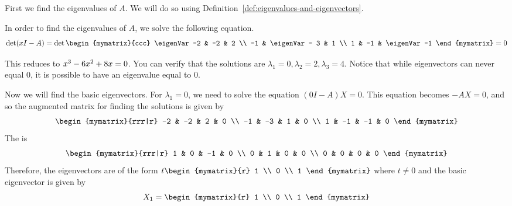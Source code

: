 \begin{solution}
First we find the eigenvalues of $A$. We will do so using Definition~\ref{def:eigenvalues-and-eigenvectors}. 

In order to find the eigenvalues of $A$, we solve the following equation.
\begin{equation*}
\det (\eigenVar I -A) =
\det  \begin{mymatrix}{ccc}
\eigenVar -2 & -2 & 2 \\
 -1 & \eigenVar - 3  & 1 \\
1 & -1 &  \eigenVar  -1 
\end{mymatrix}
 =0
\end{equation*}

This reduces to $ x^{3}-6 x^{2}+8x =0$. You can verify that the
solutions are $ \lambda_1 = 0, \lambda_2 = 2, \lambda_3 = 4$.
Notice that while eigenvectors can never equal $0$, it is possible to have an eigenvalue equal to $0$. 

Now we will find the basic eigenvectors. For $\lambda_1 =0$, we need to solve the equation
$(0 I - A) X = 0$. This equation becomes $-AX=0$, and so the augmented matrix for finding
the solutions is given by 
\begin{equation*}
\begin{mymatrix}{rrr|r}
-2 & -2 & 2 & 0 \\
-1 & -3 & 1 & 0 \\
1 & -1 & -1 & 0
\end{mymatrix}
\end{equation*}
The {\rref} is
\begin{equation*}
\begin{mymatrix}{rrr|r}
1 & 0 & -1 & 0 \\
0 & 1 &  0 & 0 \\
0 & 0 &  0 & 0
\end{mymatrix}
\end{equation*}
Therefore, the eigenvectors are of the form $ t\begin{mymatrix}{r}
1 \\
0 \\
1
\end{mymatrix}$ where $t\neq 0$ and the basic eigenvector is given by
\begin{equation*}
X_1
=
\begin{mymatrix}{r}
1 \\
0 \\
1
\end{mymatrix}
\end{equation*}


\end{solution}
